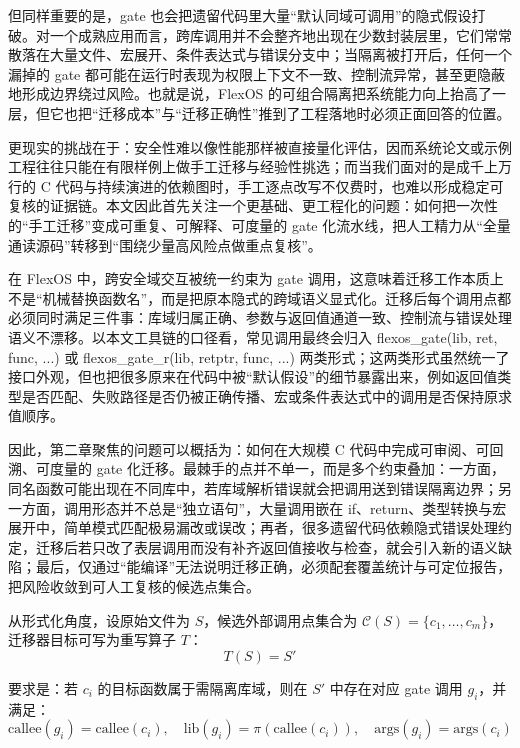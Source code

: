 \documentclass[UTF8,a4paper,12pt,twoside]{ctexart}  %
\begin{document}
但同样重要的是，gate 也会把遗留代码里大量``默认同域可调用''的隐式假设打破。对一个成熟应用而言，跨库调用并不会整齐地出现在少数封装层里，它们常常散落在大量文件、宏展开、条件表达式与错误分支中；当隔离被打开后，任何一个漏掉的 gate 都可能在运行时表现为权限上下文不一致、控制流异常，甚至更隐蔽地形成边界绕过风险。也就是说，FlexOS 的可组合隔离把系统能力向上抬高了一层，但它也把``迁移成本''与``迁移正确性''推到了工程落地时必须正面回答的位置。

更现实的挑战在于：安全性难以像性能那样被直接量化评估，因而系统论文或示例工程往往只能在有限样例上做手工迁移与经验性挑选；而当我们面对的是成千上万行的 C 代码与持续演进的依赖图时，手工逐点改写不仅费时，也难以形成稳定可复核的证据链。本文因此首先关注一个更基础、更工程化的问题：如何把一次性的``手工迁移''变成可重复、可解释、可度量的 gate 化流水线，把人工精力从``全量通读源码''转移到``围绕少量高风险点做重点复核''。

在 FlexOS 中，跨安全域交互被统一约束为 gate
调用，这意味着迁移工作本质上不是``机械替换函数名''，而是把原本隐式的跨域语义显式化。迁移后每个调用点都必须同时满足三件事：库域归属正确、参数与返回值通道一致、控制流与错误处理语义不漂移。以本文工具链的口径看，常见调用最终会归入
flexos\_gate(lib, ret, func, ...) 或 flexos\_gate\_r(lib, retptr, func,
...)
两类形式；这两类形式虽然统一了接口外观，但也把很多原来在代码中被``默认假设''的细节暴露出来，例如返回值类型是否匹配、失败路径是否仍被正确传播、宏或条件表达式中的调用是否保持原求值顺序。

因此，第二章聚焦的问题可以概括为：如何在大规模 C
代码中完成可审阅、可回溯、可度量的 gate
化迁移。最棘手的点并不单一，而是多个约束叠加：一方面，同名函数可能出现在不同库中，若库域解析错误就会把调用送到错误隔离边界；另一方面，调用形态并不总是``独立语句''，大量调用嵌在
if、return、类型转换与宏展开中，简单模式匹配极易漏改或误改；再者，很多遗留代码依赖隐式错误处理约定，迁移后若只改了表层调用而没有补齐返回值接收与检查，就会引入新的语义缺陷；最后，仅通过``能编译''无法说明迁移正确，必须配套覆盖统计与可定位报告，把风险收敛到可人工复核的候选点集合。

从形式化角度，设原始文件为 \(S\)，候选外部调用点集合为
\(\mathcal{C}(S)=\{c_1,\dots,c_m\}\)，迁移器目标可写为重写算子 \(T\)：
\begin{equation}
  T(S) = S'
\end{equation}

要求是：若 \(c_i\) 的目标函数属于需隔离库域，则在 \(S'\) 中存在对应 gate
调用 \(g_i\)，并满足：
\begin{equation}
  \text{callee}(g_i)=\text{callee}(c_i),\quad \text{lib}(g_i)=\pi(\text{callee}(c_i)),\quad \text{args}(g_i)=\text{args}(c_i)
\end{equation}
\end{document}
